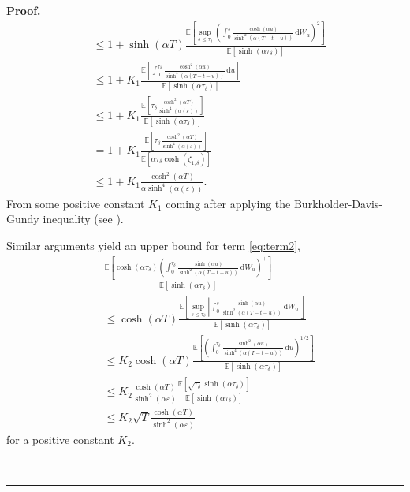 \documentclass{tufte-handout}
\newcommand{\E}{\mathbb{E}} %
\newcommand{\dif}{\mathrm{d}}
\newenvironment{pf}[1][Proof]{\textbf{#1.} }{\ \rule{0.5em}{0.5em}}
\begin{document}
\begin{pf}
\begin{align*}
		&\leq 1 + \sinh(\alpha T)\frac{\E\left[\sup_{s\leq \tau_\delta}\left(\int_{0}^{s}\frac{\cosh(\alpha u)}{\sinh^2(\alpha(T - t - u))}\,\dif W_u\right)^2\right]}{\E\left[\sinh(\alpha\tau_\delta)\right]} \\
		&\leq 1 + K_1\frac{\E\left[\int_{0}^{\tau_\delta}\frac{\cosh^2(\alpha u)}{\sinh^4(\alpha(T - t - u))}\,\dif u\right]}{\E\left[\sinh(\alpha\tau_\delta)\right]} \\
		&\leq 1 + K_1\frac{\E\left[\tau_\delta\frac{\cosh^2(\alpha T)}{\sinh^4(\alpha(\varepsilon))}\right]}{\E\left[\sinh(\alpha\tau_\delta)\right]} \\
		&= 1 + K_1\frac{\E\left[\tau_\delta\frac{\cosh^2(\alpha T)}{\sinh^4(\alpha(\varepsilon))}\right]}{\E\left[\alpha\tau_\delta\cosh(\zeta_{1,\delta})\right]} \\
		&\leq 1 + K_1\frac{\cosh^2(\alpha T)}{\alpha\sinh^4(\alpha(\varepsilon))}.
		\end{align*}
		From some positive constant $K_1$ coming after applying the Burkholder-Davis-Gundy inequality (see \citet[Corollary 4.2]{revuz_continuous_1999}).
		
		Similar arguments yield an upper bound for term \eqref{eq:term2},
		\begin{align*}
		&\frac{\E\left[\cosh(\alpha\tau_\delta)\left(\int_{0}^{\tau_\delta}\frac{\sinh(\alpha u)}{\sinh^2(\alpha(T - t - u))}\,\dif W_u\right)^+\right]}{\E\left[\sinh(\alpha\tau_\delta)\right]} \\
		&\leq \cosh(\alpha T)\frac{\E\left[\sup_{s\leq \tau_\delta}\left|\int_{0}^{s}\frac{\sinh(\alpha u)}{\sinh^2(\alpha(T - t - u))}\,\dif W_u\right|\right]}{\E\left[\sinh(\alpha\tau_\delta)\right]} \\
		&\leq K_2\cosh(\alpha T)\frac{\E\left[\left(\int_{0}^{\tau_\delta}\frac{\sinh^2(\alpha u)}{\sinh^4(\alpha(T - t - u))}\,\dif u\right)^{1/2}\right]}{\E\left[\sinh(\alpha\tau_\delta)\right]} \\
		&\leq K_2\frac{\cosh(\alpha T)}{\sinh^2(\alpha\varepsilon)}\frac{\E\left[\sqrt{\tau_\delta}\sinh(\alpha \tau_\delta)\right]}{\E\left[\sinh(\alpha\tau_\delta)\right]} \\
		&\leq K_2\sqrt{T}\frac{\cosh(\alpha T)}{\sinh^2(\alpha\varepsilon)}
		\end{align*}
		for a positive constant $K_2$.
		
		
		
		
		
		
		
		
		
		
		

\end{pf}
\end{document}
